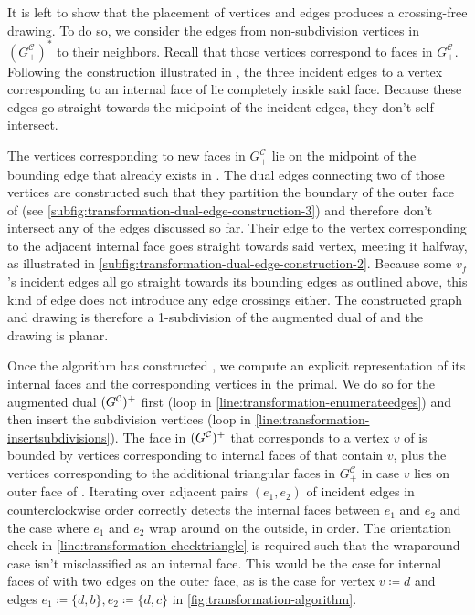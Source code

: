 It is left to show that the placement of vertices and edges produces a crossing-free drawing.
To do so, we consider the edges from non-subdivision vertices in $(G_+^\mathcal{C})^*$ to their neighbors.
Recall that those vertices correspond to faces in $G_+^\mathcal{C}$.
Following the construction illustrated in , the three incident edges to a vertex corresponding to an internal face of \clustergraph{} lie completely inside said face.
Because these edges go straight towards the midpoint of the incident edges, they don't self-intersect.

The vertices corresponding to new faces in $G_+^\mathcal{C}$ lie on the midpoint of the bounding edge that already exists in \clustergraph{}.
The dual edges connecting two of those vertices are constructed such that they partition the boundary of the outer face of \clustergraph{} (see \cref{subfig:transformation-dual-edge-construction-3}) and therefore don't intersect any of the edges discussed so far.
Their edge to the vertex corresponding to the adjacent internal face goes straight towards said vertex, meeting it halfway, as illustrated in \cref{subfig:transformation-dual-edge-construction-2}.
Because some $v_f$'s incident edges all go straight towards its bounding edges as outlined above, this kind of edge does not introduce any edge crossings either.
The constructed graph and drawing is therefore a 1-subdivision of the augmented dual of \clustergraph{} and the drawing is planar.

Once the algorithm has constructed \initmap{}, we compute an explicit representation of its internal faces and the corresponding vertices in the primal.
We do so for the augmented dual $(G^\mathcal{C}_{})^+$ first (loop in \cref{line:transformation-enumerateedges}) and then insert the subdivision vertices (loop in \cref{line:transformation-insertsubdivisions}).
The face in $(G^\mathcal{C}_{})^+$ that corresponds to a vertex $v$ of \clustergraph{} is bounded by vertices corresponding to internal faces of \clustergraph{} that contain $v$, plus the vertices corresponding to the additional triangular faces in $G_+^\mathcal{C}$ in case $v$ lies on outer face of \clustergraph{}.
Iterating over adjacent pairs $(e_1, e_2)$ of incident edges in counterclockwise order correctly detects the internal faces between $e_1$ and $e_2$ and the case where $e_1$ and $e_2$ wrap around on the outside, in order.
The orientation check in \cref{line:transformation-checktriangle} is required such that the wraparound case isn't misclassified as an internal face.
This would be the case for internal faces of \clustergraph{} with two edges on the outer face, as is the case for vertex $v \coloneqq d$ and edges $e_1 \coloneqq \{d,b\}, e_2 \coloneqq \{d,c\}$ in \cref{fig:transformation-algorithm}.



